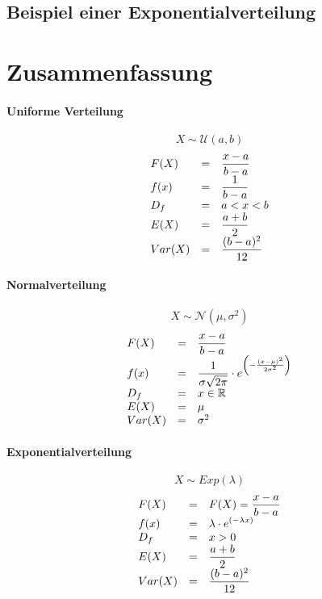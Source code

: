 \subsection{Beispiel einer Exponentialverteilung}

\newpage
\section{Zusammenfassung}
\paragraph{Uniforme Verteilung}
\[ X \sim \mathcal{U}(a,b) \]
\[ \begin{array}{l c l}
	F(X) 
		& =
		& \displaystyle \frac{x-a}{b-a} \\
	f(x)	
		& =
		& \displaystyle \frac{1}{b-a}  \\
	D_f	
		& = 
		& a < x < b \\
	E(X)
		& = 
		& \displaystyle \frac{a+b}{2}\\
	Var(X)	
		& =
		& \displaystyle \frac{(b-a)^2}{12}\\
\end{array} \]

\paragraph{Normalverteilung}
\[ X \sim \mathcal{N}(\mu, \sigma^2) \]
\[ \begin{array}{l c l}
	F(X) 
		& =
		& \displaystyle \frac{x-a}{b-a} \\
	f(x)	
		& =
		& \displaystyle \frac{1}{\sigma\sqrt{2\pi}} \cdot
				e^{\left(
					-\frac{(x-\mu)^2}{2\sigma^2}
				\right)} \\
	D_f	
		& = 
		& x \in \mathbb{R} \\
	E(X)
		& = 
		& \mu\\
	Var(X)	
		& =
		& \sigma^2 \\
\end{array} \]

\paragraph{Exponentialverteilung}
\[ X \sim Exp(\lambda) \]
\[ \begin{array}{l c l}
	F(X) 
		& =
		& F(X) = \displaystyle \frac{x-a}{b-a} \\
	f(x)	
		& =
		& \displaystyle \lambda \cdot 
				e^{\left(
					-\lambda x
				\right)} \\
	D_f	
		& = 
		& x > 0 \\
	E(X)
		& = 
		& \displaystyle \frac{a+b}{2}\\
	Var(X)	
		& =
		& \displaystyle \frac{(b-a)^2}{12}\\
\end{array} \]


